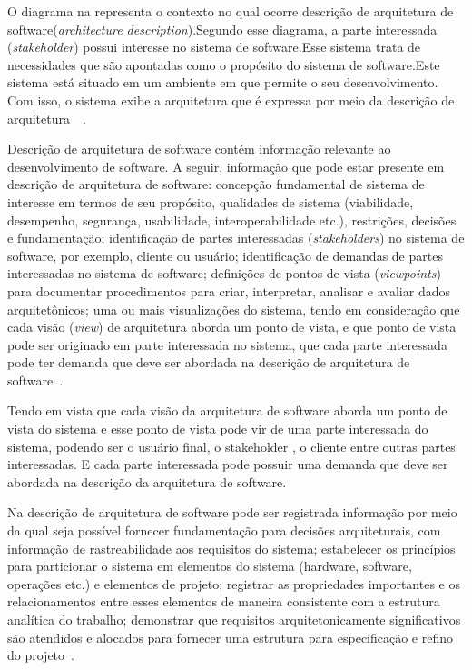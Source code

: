 %

O diagrama na  representa o contexto no qual ocorre descrição de arquitetura de software(\emph{architecture description}).Segundo esse diagrama, a parte interessada (\emph{stakeholder}) possui interesse no sistema de software.Esse sistema trata de necessidades que são apontadas como o propósito do sistema de software.Este sistema está situado em um ambiente em que permite o seu desenvolvimento. Com isso, o sistema exibe a arquitetura que é expressa por meio da descrição de arquitetura~\cite{ISO_1471}~\cite{ISO_42010}. 

Descrição de arquitetura de software contém informação relevante ao desenvolvimento de software. A seguir, informação que pode estar presente em descrição de arquitetura de software: concepção fundamental de sistema de interesse em termos de seu propósito, qualidades de sistema (viabilidade, desempenho, segurança, usabilidade, interoperabilidade etc.), restrições, decisões e fundamentação; identificação de partes interessadas (\emph{stakeholders}) no sistema de software, por exemplo, cliente ou usuário; identificação de demandas de partes interessadas no sistema de software; definições de pontos de vista (\emph{viewpoints}) para documentar procedimentos para criar, interpretar, analisar e avaliar dados arquitetônicos; uma ou mais visualizações do sistema, tendo em consideração que cada visão (\emph{view}) de arquitetura aborda um ponto de vista, e que ponto de vista pode ser originado em parte interessada no sistema, que cada parte interessada pode ter demanda que deve ser abordada na descrição de arquitetura de software~\cite{ISO_15289}. 

Tendo em vista que cada visão da arquitetura de software aborda um ponto de vista do sistema e esse ponto de vista pode vir de uma parte interessada do sistema, podendo ser o usuário final, o stakeholder , o cliente entre outras partes interessadas. E cada parte interessada pode possuir uma demanda que deve ser abordada  na descrição da arquitetura de software. 

Na descrição de arquitetura de software pode ser registrada informação por meio da qual seja possível  fornecer fundamentação para decisões arquiteturais, com informação de rastreabilidade aos requisitos do sistema; estabelecer os princípios para particionar o sistema em elementos do sistema (hardware, software, operações etc.) e elementos de projeto; registrar as propriedades importantes e os relacionamentos entre esses elementos de maneira consistente com a estrutura analítica do trabalho; demonstrar que requisitos arquitetonicamente significativos são atendidos e alocados para fornecer uma estrutura para especificação e refino do projeto~\cite{ISO_15289}. 

